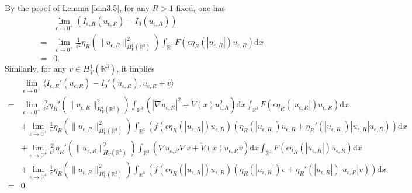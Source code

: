\documentclass[12pt]{amsart}
\numberwithin{equation}{section}
\theoremstyle{definition}
\begin{document}
By the proof of Lemma \ref{lem3.5}, for any $R>1$ fixed, one has
\begin{equation*}
		\begin{split}
		&\lim\limits_{\epsilon\to0^+}\left(I_{\epsilon,R}(u_{\epsilon,R})-I_{0}(u_{\epsilon,R})\right)\\
        =&\lim\limits_{\epsilon\to0^+}\frac{1}{\epsilon ^{2}}\eta _{R}\left (\|u_{\epsilon,R}\|^{2}_{H^1_{V}(\mathbb{R}^3)}\right )\int_{\mathbb{R}^{3}}F\left (\epsilon \eta _{R} \left ( \left | u_{\epsilon,R}\right |\right )u_{\epsilon,R}\right )\text{d}x\\
        =&0.
	\end{split}\end{equation*}
Similarly, for any $v\in H^{1}_{V}(\mathbb{R}^3)$, it implies
\begin{equation*}
		\begin{split}
		&\lim\limits_{\epsilon\to0^+}\langle I_{\epsilon,R}'(u_{\epsilon,R})-I_{0}'(u_{\epsilon,R}),u_{\epsilon,R}+v\rangle\\
        =&\lim\limits_{\epsilon\to0^+}\frac{2}{\epsilon^{2}}\eta _{R}'\left ( \|u_{\epsilon,R}\|^{2}_{H^1_{V}(\mathbb{R}^3)} \right )\int_{\mathbb{R}^{3}}(|\nabla u_{\epsilon,R}|^2+\tilde V(x)u^2_{\epsilon,R}) \text{d}x\int_{\mathbb{R}^{3}}F\left (\epsilon\eta _{R}\left ( \left | u_{\epsilon,R}\right | \right ) u_{\epsilon,R}\right )\text{d}x\\
        &+\lim\limits_{\epsilon\to0^+}\frac{1}{\epsilon}\eta _{R}\left ( \|u_{\epsilon,R}\|^{2}_{H^1_{V}(\mathbb{R}^3)} \right )\int_{\mathbb{R}^{3}}\left(f\left (\epsilon \eta _{R}\left ( \left | u_{\epsilon,R}\right | \right ) u_{\epsilon,R}\right )\left (\eta _{R}\left ( \left | u_{\epsilon,R}\right | \right ) u_{\epsilon,R} +\eta _{R}'\left ( \left | u_{\epsilon,R}\right |\right )|u_{\epsilon,R}|u_{\epsilon,R} \right )\right)\text{d}x\\
        &+\lim\limits_{\epsilon\to0^+}\frac{2}{\epsilon^{2}}\eta _{R}'\left ( \|u_{\epsilon,R}\|^{2}_{H^1_{V}(\mathbb{R}^3)} \right )\int_{\mathbb{R}^{3}}(\nabla u_{\epsilon,R}\nabla v+\tilde V(x)u_{\epsilon,R}v) \text{d}x\int_{\mathbb{R}^{3}}F\left (\epsilon\eta _{R}\left ( \left | u_{\epsilon,R}\right | \right ) u_{\epsilon,R}\right )\text{d}x\\
        &+\lim\limits_{\epsilon\to0^+}\frac{1}{\epsilon}\eta _{R}\left ( \|u_{\epsilon,R}\|^{2}_{H^1_{V}(\mathbb{R}^3)} \right )\int_{\mathbb{R}^{3}}\left(f\left (\epsilon \eta _{R}\left ( \left | u_{\epsilon,R}\right | \right ) u_{\epsilon,R}\right )\left (\eta _{R}\left ( \left | u_{\epsilon,R}\right | \right ) v +\eta _{R}'\left ( \left | u_{\epsilon,R}\right |\right )|u_{\epsilon,R}|v \right )\right)\text{d}x\\
        =&0.
	\end{split}\end{equation*}
\end{document}

